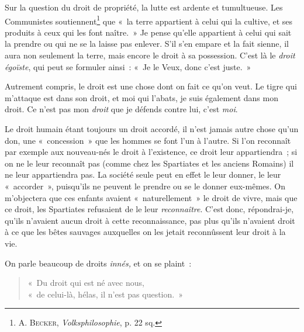 \documentclass[french,twoside]{book} %
\begin{document}
Sur la question du droit de propriété, la lutte est ardente et tumultueuse. Les Communistes soutiennent\footnote{ \noindent A. B{\scshape ecker}, \emph{Volksphilosophie}, p. 22 sq.
 }  que « la terre appartient à celui qui la cultive, et ses produits à ceux qui les font naître. » Je pense qu’elle appartient à celui qui sait la prendre ou qui ne se la laisse pas enlever. S’il s’en empare et la fait sienne, il aura non seulement la terre, mais encore le droit à sa possession. C’est là le \emph{droit égoïste}, qui peut se formuler ainsi : « Je le Veux, donc c’est juste. »\par
Autrement compris, le droit est une chose dont on fait ce qu’on veut. Le tigre qui m’attaque est dans son droit, et moi qui l’abats, je suis également dans mon droit. Ce n’est pas mon \emph{droit} que je défends contre lui, c’est \emph{moi}.\par
Le droit humain étant toujours un droit accordé, il n’est jamais autre chose qu’un don, une « concession » que les hommes se font l’un à l’autre. Si l’on reconnaît par exemple aux nouveau-nés le droit à l’existence, ce droit leur appartiendra ; si on ne le leur reconnaît pas (comme chez les Spartiates et les anciens Romains) il ne leur appartiendra pas. La société seule peut en effet le leur donner, le leur « accorder », puisqu’ils ne peuvent le prendre ou se le donner eux-mêmes. On m’objectera que ces enfants avaient « naturellement » le droit de vivre, mais que ce droit, les Spartiates refusaient de le leur \emph{reconnaître}. C’est donc, répondrai-je, qu’ils n’avaient aucun droit à cette reconnaissance, pas plus qu’ils n’avaient droit à ce que les bêtes sauvages auxquelles on les jetait reconnûssent leur droit à la vie.\par
On parle beaucoup de droits \emph{innés,} et on se plaint :\par


\begin{verse}
« Du droit qui est né avec nous,\\
« de celui-là, hélas, il n’est pas question. »\\
\end{verse}
\end{document}
